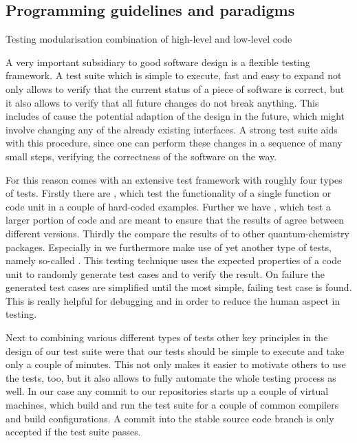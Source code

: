 \subsection{Programming guidelines and paradigms}
\label{sec:ProgrammingGuidelines}



Testing
modularisation
combination of high-level and low-level code

A very important subsidiary to good software design is a flexible testing framework.
A test suite which is simple to execute, fast and easy to expand not only allows to verify
that the current status of a piece of software is correct,
but it also allows to verify that all future changes do not break anything.
This includes of cause the potential adaption of the design in the future,
which might involve changing any of the already existing interfaces.
A strong test suite aids with this procedure,
since one can perform these changes in a sequence of many small steps,
verifying the correctness of the software on the way.

For this reason \molsturm comes with an extensive test framework
with roughly four types of tests.
Firstly there are ,
which test the functionality of a single function or code unit in a couple of hard-coded examples.
Further we have ,
which test a larger portion of code and are meant to ensure that
the results of \molsturm agree between different versions.
Thirdly the  compare
the results of \molsturm to other quantum-chemistry packages.
Especially in \lazyten we furthermore make use of yet another type of tests,
namely so-called .
This testing technique uses the expected properties of a code unit
to randomly generate test cases and to verify the result.
On failure the generated test cases are simplified until the most simple,
failing test case is found.
This is really helpful for debugging and in order to reduce the human aspect in testing.

Next to combining various different types of tests
other key principles in the design of our test suite were that our tests should be simple
to execute and take only a couple of minutes.
This not only makes it easier to motivate others to use the tests, too,
but it also allows to fully automate the whole testing process as well.
In our case any commit to our repositories starts up a couple of virtual machines,
which build \molsturm and run the test suite for a couple of common compilers and
build configurations.
A commit into the stable source code branch is only accepted if the test suite passes.


